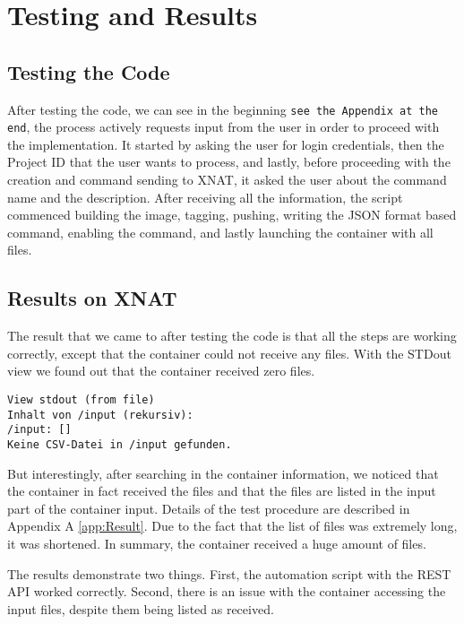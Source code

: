 
\chapter{Testing and Results}
\section{Testing the Code}
After testing the code, we can see in the beginning \texttt{see the Appendix at the end}, the process actively requests input from the user in order to proceed with the implementation. It started by asking the user for login credentials, then the Project ID that the user wants to process, and lastly, before proceeding with the creation and command sending to XNAT, it asked the user about the command name and the description.
After receiving all the information, the script commenced building the image, tagging, pushing, writing the JSON format based command, enabling the command, and lastly launching the container with all files.

\section{Results on XNAT}
The result that we came to after testing the code is that all the steps are working correctly, except that the container could not receive any files. With the \ac{STDout} view we found out that the container received zero files. 
 
\begin{lstlisting}[numbers=none]
View stdout (from file)
Inhalt von /input (rekursiv):
/input: []
Keine CSV-Datei in /input gefunden.
\end{lstlisting}


But interestingly, after searching in the container information, we noticed that the container in fact received the files and that the files are listed in the input part of the container input. 
Details of the test procedure are described in Appendix A \ref{app:Result}. Due to the fact that the list of files was extremely long, it was shortened. In summary, the container received a huge amount of files.

The results demonstrate two things. First, the automation script with the REST API worked correctly. Second, there is an issue with the container accessing the input files, despite them being listed as received.
